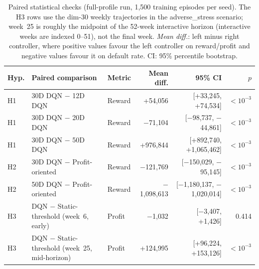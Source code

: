 \documentclass[preprint,review,authoryear,12pt]{elsarticle}
\begin{document}
\begin{table}[t]
    \centering
    \small
    \caption{Paired statistical checks (full-profile run, 1{,}500 training episodes per
        seed). The H3 rows use the dim-30 weekly trajectories in the adverse\_stress
        scenario; week~25 is roughly the midpoint of the 52-week interactive horizon
        (interactive weeks are indexed 0--51), not the final week. \textit{Mean diff.}:
        left minus right controller, where positive values favour the left controller on
        reward/profit and negative values favour it on default rate. CI: 95\% percentile
        bootstrap.}
    \label{tab:stat-tests}
    \setlength{\tabcolsep}{4pt}
    \begin{tabular}{l >{\raggedright\arraybackslash}p{} l r r r}
        \toprule
        Hyp. & Paired comparison                               & Metric & Mean diff.   & 95\% CI                      & $p$          \\
        \midrule
        H1   & 30D DQN $-$ 12D DQN                             & Reward & +54{,}056      & [+33{,}245, +74{,}534]           & $<\!10^{-3}$ \\
        H1   & 30D DQN $-$ 20D DQN                             & Reward & $-$71{,}104    & [$-$98{,}737, $-$44{,}861]       & $<\!10^{-3}$ \\
        H1   & 30D DQN $-$ 50D DQN                             & Reward & +976{,}844     & [+892{,}740, +1{,}065{,}462]     & $<\!10^{-3}$ \\
        H2   & 30D DQN $-$ Profit-oriented                     & Reward & $-$121{,}769   & [$-$150{,}029, $-$95{,}145]      & $<\!10^{-3}$ \\
        H2   & 50D DQN $-$ Profit-oriented                     & Reward & $-$1{,}098{,}613 & [$-$1{,}180{,}137, $-$1{,}020{,}014] & $<\!10^{-3}$ \\
        H3   & DQN $-$ Static-threshold (week~6, early)        & Profit & $-$1{,}032     & [$-$3{,}407, +1{,}426]           & 0.414        \\
        H3   & DQN $-$ Static-threshold (week~25, mid-horizon) & Profit & +124{,}995     & [+96{,}224, +153{,}126]          & $<\!10^{-3}$ \\
        \bottomrule
    \end{tabular}
\end{table}
\end{document}
